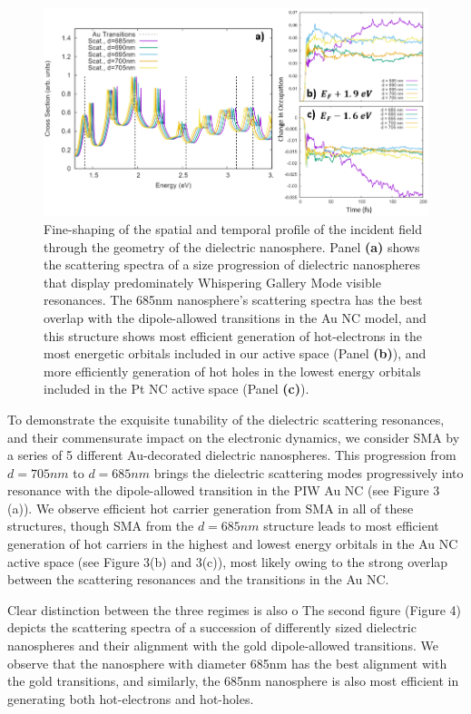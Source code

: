 \documentclass[journal=jpclcd,manuscript=article]{achemso}
\begin{document}
\begin{figure}
\begin{center}
\includegraphics[width=6in]{figs/Au_WGM_Spectrum_and_Trajectories.png}
\caption{Fine-shaping of the spatial and temporal profile of the incident field
through the geometry of the dielectric nanosphere.  Panel {\bf (a)} shows
the scattering spectra of a size progression of dielectric nanospheres that display
predominately Whispering Gallery Mode visible resonances.  The
685nm nanosphere's scattering spectra has the best overlap with the dipole-allowed
transitions in the Au NC model, and this structure shows most efficient
generation of hot-electrons in the most energetic orbitals included in our
active space (Panel {\bf (b)}), and more efficiently generation of
hot holes in the lowest energy orbitals included in the Pt NC active space (Panel
{\bf (c)}).   }
\end{center}
\end{figure}
To demonstrate the exquisite tunability of the dielectric scattering resonances, and their 
commensurate impact on the electronic dynamics, we consider SMA by a series of 5 different Au-decorated dielectric
nanospheres.  This progression from $d=705 nm$ to $d=685 nm$ brings the dielectric scattering modes progressively 
into resonance with the dipole-allowed transition in the PIW Au NC (see Figure 3 (a)).  We observe efficient hot carrier
generation from SMA in all of these structures, though SMA from the $d=685 nm$ structure leads to most efficient generation
of hot carriers in the highest and lowest energy orbitals in the Au NC active space (see Figure 3(b) and 3(c)), 
most likely owing to the strong overlap between the scattering resonances and the transitions in the Au NC.

Clear distinction between the three regimes is also o
The second figure (Figure 4) depicts the scattering spectra of a succession of differently sized dielectric nanospheres
and their alignment with the gold dipole-allowed transitions. We observe that the nanosphere with diameter 685nm
has the best alignment with the gold transitions, and similarly, the 685nm nanosphere is also most efficient
in generating both hot-electrons and hot-holes. 
\end{document}
